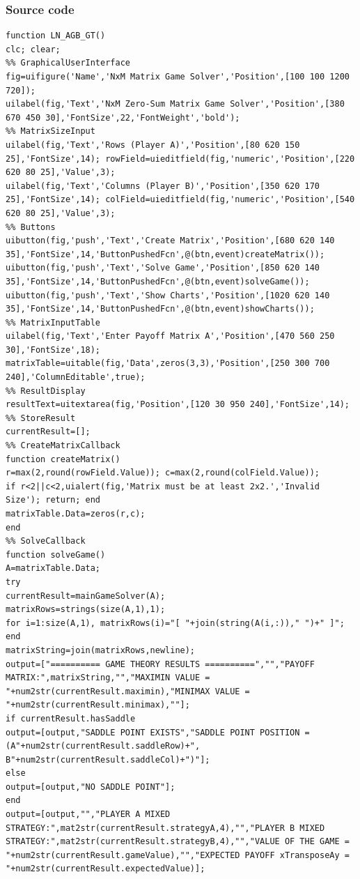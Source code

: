 \documentclass[12pt,a4paper]{article}
\begin{document}
\subsubsection{Source code}
\begin{lstlisting}[style=code]
function LN_AGB_GT()
clc; clear;
%% GraphicalUserInterface
fig=uifigure('Name','NxM Matrix Game Solver','Position',[100 100 1200 720]);
uilabel(fig,'Text','NxM Zero-Sum Matrix Game Solver','Position',[380 670 450 30],'FontSize',22,'FontWeight','bold');
%% MatrixSizeInput
uilabel(fig,'Text','Rows (Player A)','Position',[80 620 150 25],'FontSize',14); rowField=uieditfield(fig,'numeric','Position',[220 620 80 25],'Value',3);
uilabel(fig,'Text','Columns (Player B)','Position',[350 620 170 25],'FontSize',14); colField=uieditfield(fig,'numeric','Position',[540 620 80 25],'Value',3);
%% Buttons
uibutton(fig,'push','Text','Create Matrix','Position',[680 620 140 35],'FontSize',14,'ButtonPushedFcn',@(btn,event)createMatrix());
uibutton(fig,'push','Text','Solve Game','Position',[850 620 140 35],'FontSize',14,'ButtonPushedFcn',@(btn,event)solveGame());
uibutton(fig,'push','Text','Show Charts','Position',[1020 620 140 35],'FontSize',14,'ButtonPushedFcn',@(btn,event)showCharts());
%% MatrixInputTable
uilabel(fig,'Text','Enter Payoff Matrix A','Position',[470 560 250 30],'FontSize',18);
matrixTable=uitable(fig,'Data',zeros(3,3),'Position',[250 300 700 240],'ColumnEditable',true);
%% ResultDisplay
resultText=uitextarea(fig,'Position',[120 30 950 240],'FontSize',14);
%% StoreResult
currentResult=[];
%% CreateMatrixCallback
function createMatrix()
r=max(2,round(rowField.Value)); c=max(2,round(colField.Value));
if r<2||c<2,uialert(fig,'Matrix must be at least 2x2.','Invalid Size'); return; end
matrixTable.Data=zeros(r,c);
end
%% SolveCallback
function solveGame()
A=matrixTable.Data;
try
currentResult=mainGameSolver(A);
matrixRows=strings(size(A,1),1);
for i=1:size(A,1), matrixRows(i)="[ "+join(string(A(i,:))," ")+" ]"; end
matrixString=join(matrixRows,newline);
output=["========== GAME THEORY RESULTS ==========","","PAYOFF MATRIX:",matrixString,"","MAXIMIN VALUE = "+num2str(currentResult.maximin),"MINIMAX VALUE = "+num2str(currentResult.minimax),""];
if currentResult.hasSaddle
output=[output,"SADDLE POINT EXISTS","SADDLE POINT POSITION = (A"+num2str(currentResult.saddleRow)+", B"+num2str(currentResult.saddleCol)+")"];
else
output=[output,"NO SADDLE POINT"];
end
output=[output,"","PLAYER A MIXED STRATEGY:",mat2str(currentResult.strategyA,4),"","PLAYER B MIXED STRATEGY:",mat2str(currentResult.strategyB,4),"","VALUE OF THE GAME = "+num2str(currentResult.gameValue),"","EXPECTED PAYOFF xTransposeAy = "+num2str(currentResult.expectedValue)];

\end{lstlisting}
\end{document}
